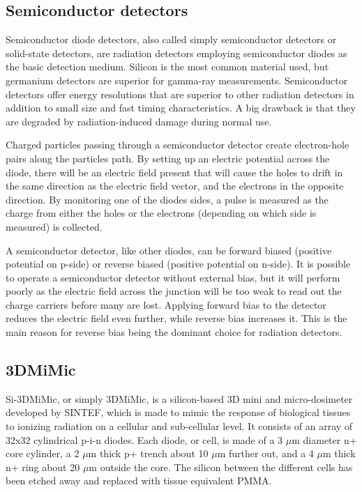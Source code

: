 \documentclass[../main/thesis.tex]{subfiles}
\begin{document}



\subsection{Semiconductor detectors}
\label{t-semi}
Semiconductor diode detectors, also called simply semiconductor detectors or solid-state detectors, are radiation detectors employing semiconductor diodes as the basic detection medium. Silicon is the most common material used, but germanium detectors are superior for gamma-ray measurements. Semiconductor detectors offer energy resolutions that are superior to other radiation detectors in addition to small size and fast timing characteristics. A big drawback is that they are degraded by radiation-induced damage during normal use. \citep[chap. 11]{Knoll}

Charged particles passing through a semiconductor detector create electron-hole pairs along the particles path. By setting up an electric potential across the diode, there will be an electric field present that will cause the holes to drift in the same direction as the electric field vector, and the electrons in the opposite direction. By monitoring one of the diodes sides, a pulse is measured as the charge from either the holes or the electrons (depending on which side is measured) is collected. 

A semiconductor detector, like other diodes, can be forward biased (positive potential on p-side) or reverse biased (positive potential on n-side). It is possible to operate a semiconductor detector without external bias, but it will perform poorly as the electric field across the junction will be too weak to read out the charge carriers before many are lost. Applying forward bias to the detector reduces the electric field even further, while reverse bias increases it. This is the main reason for reverse bias being the dominant choice for radiation detectors. \citep[chap. 11]{Knoll}


\subsection{3DMiMic}
\label{t-3d}
Si-3DMiMic, or simply 3DMiMic, is a silicon-based 3D mini and micro-dosimeter developed by SINTEF, which is made to mimic the response of biological tissues to ionizing radiation on a cellular and sub-cellular level. It consists of an array of 32x32 cylindrical p-i-n diodes. Each diode, or cell, is made of a 3 $\mu$m diameter n+ core cylinder, a 2 $\mu$m thick p+ trench about 10 $\mu$m further out, and a 4 $\mu$m thick n+ ring about 20 $\mu$m outside the core. The silicon between the different cells has been etched away and replaced with tissue equivalent \gls{PMMA}. %
\end{document}
